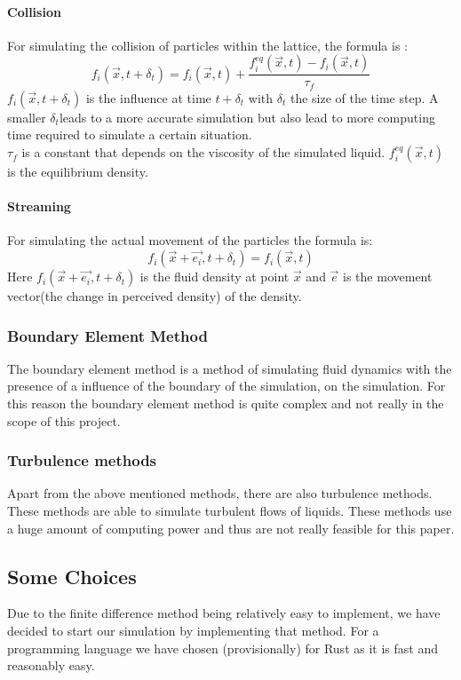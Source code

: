 \documentclass{article}
\begin{document}
\paragraph{Collision} %
For simulating the collision of particles within the lattice, the formula is \cite{Lattice Boltzmann implementation}:
\[f_{i}(\vec{x}, t + \delta_t) = f_{i}(\vec{x}, t) + \frac{f_{i}^{eq}(\vec{x},t) - f_{i}(\vec{x},t)}{\tau_{f}}\]
$f_{i}(\vec{x}, t + \delta_t)$ is the influence at time $t + \delta_t$ with $\delta_t$ the size of the time step. A smaller $\delta_t$leads to a more accurate simulation but also lead to more computing time required to simulate a certain situation. \\
$\tau_{f}$ is a constant that depends on the viscosity of the simulated liquid. $f_{i}^{eq}(\vec{x},t)$ is the equilibrium density.
\paragraph{Streaming}
For simulating the actual movement of the particles the formula is: 
\[f_{i}(\vec{x}+\vec{e_i},t + \delta_t) = f_{i}(\vec{x},t)\]
Here $f_{i}(\vec{x}+\vec{e_i},t + \delta_t)$ is the fluid density at point $\vec{x}$ and $\vec{e}$ is the movement vector(the change in perceived density) of the density.
\subsubsection{Boundary Element Method}
The boundary element method is a method of simulating fluid dynamics with the presence of a influence of the boundary of the simulation, on the simulation. For this reason the boundary element method is quite complex and not really in the scope of this project. \cite{Boundary Element Method}
\subsubsection{Turbulence methods}
Apart from the above mentioned methods, there are also turbulence methods. These methods are able to simulate turbulent flows of liquids. These methods use a huge amount of computing power and thus are not really feasible for this paper.
\subsection{Some Choices}
Due to the finite difference method being relatively easy to implement, we have decided to start our simulation by implementing that method. For a programming language we have chosen (provisionally) for Rust as it is fast and reasonably easy.
\end{document}
